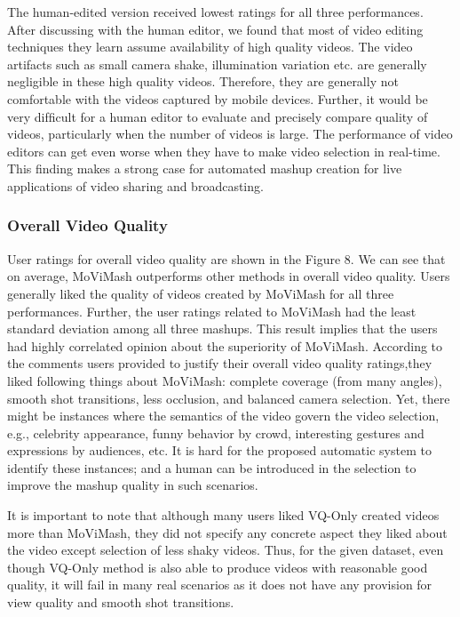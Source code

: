 \documentclass{sig-alternate}
\begin{document}
The human-edited version received lowest ratings for all three performances. After discussing with the human editor, we found that most of video editing techniques they learn assume availability of high quality videos. The video artifacts such as small camera shake, illumination variation etc. are generally negligible in these high quality videos. Therefore, they are generally not comfortable with the videos captured by mobile devices. Further, it would be very difﬁcult for a human editor to evaluate and precisely compare quality of videos, particularly when the number of videos is large. The performance of video editors can get even worse when they have to make video selection in real-time. This ﬁnding makes a strong case for automated mashup creation for live applications of video sharing and broadcasting. 

\subsubsection{ Overall Video Quality}
User ratings for overall video quality are shown in the Figure 8. We can see that on average, MoViMash outperforms other methods in overall video quality. Users generally liked the quality of videos created by MoViMash for all three performances. Further, the user ratings related to MoViMash had the least standard deviation among all three mashups. This result implies that the users had highly correlated opinion about the superiority of MoViMash. According to the comments users provided to justify their overall video quality ratings,they liked following things about MoViMash: complete coverage (from many angles), smooth shot transitions, less occlusion, and balanced camera selection. Yet, there might be instances where the semantics of the video govern the video selection, e.g., celebrity appearance, funny behavior by crowd, interesting gestures and expressions by audiences, etc. It is hard for the proposed automatic system to identify these instances; and a human can be introduced in the selection to improve the mashup quality in such scenarios.

It is important to note that although many users liked VQ-Only created videos more than MoViMash, they did not specify any concrete aspect they liked about the video except selection of less shaky videos. Thus, for the given dataset, even though VQ-Only method is also able to produce videos with reasonable good quality, it will fail in many real scenarios as it does not have any provision for view quality and smooth shot transitions. 
\end{document}
